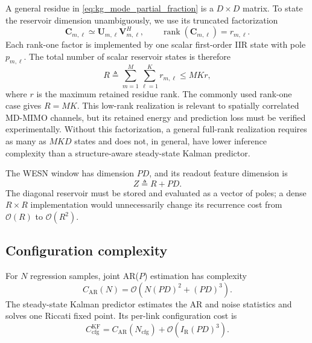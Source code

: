 \documentclass[lettersize,journal]{IEEEtran}
\begin{document}
A general residue in \eqref{eq:kg_mode_partial_fraction} is a $D\times D$
matrix.  To state the reservoir dimension unambiguously, we use its truncated
factorization
\begin{equation}
 \mathbf{C}_{m,\ell}
 \simeq
 \mathbf{U}_{m,\ell}\mathbf{V}_{m,\ell}^{H},
 \qquad
 \operatorname{rank}(\mathbf{C}_{m,\ell})=r_{m,\ell}.
\end{equation}
Each rank-one factor is implemented by one scalar first-order IIR state with
pole $p_{m,\ell}$.  The total number of scalar reservoir states is therefore
\begin{equation}
 R\triangleq\sum_{m=1}^{M}\sum_{\ell=1}^{K}r_{m,\ell}
 \leq MKr,
 \label{eq:wesn_state_count}
\end{equation}
where $r$ is the maximum retained residue rank.  The commonly used rank-one
case gives $R=MK$.  This low-rank realization is relevant to spatially
correlated MD-MIMO channels, but its retained energy and prediction loss must
be verified experimentally.  Without this factorization, a general
full-rank realization requires as many as $MKD$ states and does not, in
general, have lower inference complexity than a structure-aware steady-state
Kalman predictor.

The WESN window has dimension $PD$, and its readout feature dimension is
\begin{equation}
 Z\triangleq R+PD.
\end{equation}
The diagonal reservoir must be stored and evaluated as a vector of poles; a
dense $R\times R$ implementation would unnecessarily change its recurrence
cost from $\mathcal{O}(R)$ to $\mathcal{O}(R^2)$.

\subsection{Configuration complexity}

For $N$ regression samples, joint AR($P$) estimation has complexity
\begin{equation}
 C_{\mathrm{AR}}(N)
 =\mathcal{O}\!\left(N(PD)^2+(PD)^3\right).
 \label{eq:ar_configuration_cost}
\end{equation}
The steady-state Kalman predictor estimates the AR and noise statistics and
solves one Riccati fixed point.  Its per-link configuration cost is
\begin{equation}
 C_{\mathrm{cfg}}^{\mathrm{KF}}
 = C_{\mathrm{AR}}(N_{\mathrm{cfg}})
 +\mathcal{O}\!\left(I_{\mathrm{R}}(PD)^3\right).
 \label{eq:sskf_configuration_cost}
\end{equation}
\end{document}
